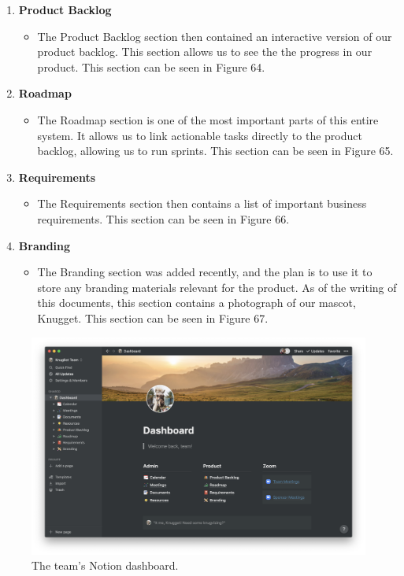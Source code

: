 \documentclass[titlepage, 12pt]{article}
\begin{document}
\begin{enumerate}
\begin{itemize}
    \end{itemize}
    \item \textbf{Product Backlog}
    \begin{itemize}
        \item The Product Backlog section then contained an interactive version of our product backlog. This section allows us to see the the progress in our product. This section can be seen in Figure 64.
    \end{itemize}
    \item \textbf{Roadmap}
    \begin{itemize}
        \item The Roadmap section is one of the most important parts of this entire system. It allows us to link actionable tasks directly to the product backlog, allowing us to run sprints. This section can be seen in Figure 65.
    \end{itemize}
    \item \textbf{Requirements}
    \begin{itemize}
        \item The Requirements section then contains a list of important business requirements. This section can be seen in Figure 66.
    \end{itemize}
    \item \textbf{Branding}
    \begin{itemize}
        \item The Branding section was added recently, and the plan is to use it to store any branding materials relevant for the product. As of the writing of this documents, this section contains a photograph of our mascot, Knugget. This section can be seen in Figure 67.
    \end{itemize}
\end{enumerate}

\begin{figure}[p]
    \centering\includegraphics[width=1\linewidth]{images/pm/dashboard.png}
    \caption{The team's Notion dashboard.}
\end{figure}
\end{document}

